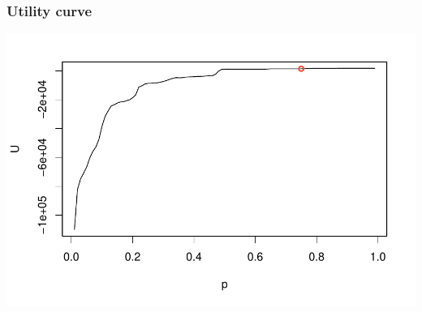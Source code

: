 \begin{frame}
\frametitle{Utility curve}

\vspace{-5mm}

\begin{center}
\includegraphics[width=\textwidth]{9-5_logistic_reg/figures/spam/utility.pdf}
\end{center}

\end{frame}



